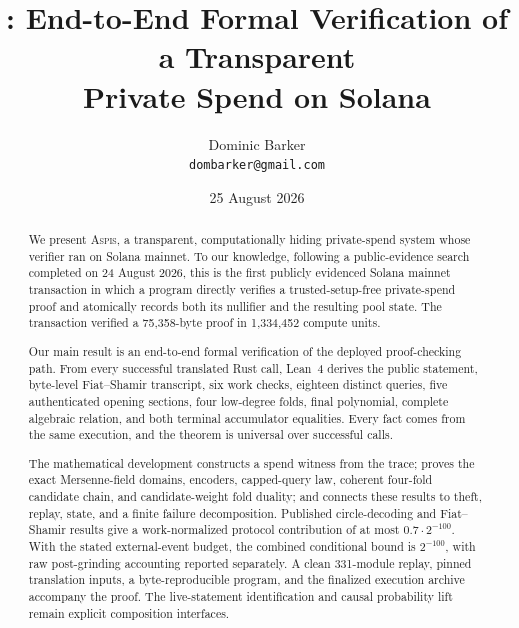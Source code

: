 \documentclass[11pt]{article}
\title{\Aspis: End-to-End Formal Verification of a Transparent\\
Private Spend on Solana}
\author{Dominic Barker\\\texttt{dombarker@gmail.com}}
\date{25 August 2026}
\theoremstyle{definition}
\theoremstyle{remark}
\newcommand{\Aspis}{\textsc{Aspis}}
\begin{document}
\maketitle

\begin{abstract}
We present \Aspis{}, a transparent, computationally hiding private-spend
system whose verifier ran on Solana mainnet.  To our knowledge, following a
public-evidence search completed on 24 August 2026, this is the first publicly
evidenced Solana mainnet transaction in which a program directly verifies a
trusted-setup-free private-spend proof and atomically records both its
nullifier and the resulting pool state.  The transaction verified a
75,358-byte proof in 1,334,452 compute units.

Our main result is an end-to-end formal verification of the deployed
proof-checking path.  From every successful translated Rust call, Lean~4
derives the public statement, byte-level Fiat--Shamir transcript, six work
checks, eighteen distinct queries, five authenticated opening sections, four
low-degree folds, final polynomial, complete algebraic relation, and both
terminal accumulator equalities.  Every fact comes from the same execution,
and the theorem is universal over successful calls.

The mathematical development constructs a spend witness from the trace;
proves the exact Mersenne-field domains, encoders, capped-query law, coherent
four-fold candidate chain, and candidate-weight fold duality; and connects
these results to theft, replay, state, and a finite failure decomposition.
Published circle-decoding and Fiat--Shamir results give a work-normalized
protocol contribution of at most \(0.7\cdot2^{-100}\).  With the stated
external-event budget, the combined conditional bound is \(2^{-100}\), with
raw post-grinding accounting reported separately.  A clean 331-module replay,
pinned translation inputs, a byte-reproducible program, and the finalized
execution archive accompany the proof.  The live-statement identification and
causal probability lift remain explicit composition interfaces.
\end{abstract}














\appendix


\begingroup
\small
\setlength{\bibsep}{0.35em}


\endgroup
\end{document}
